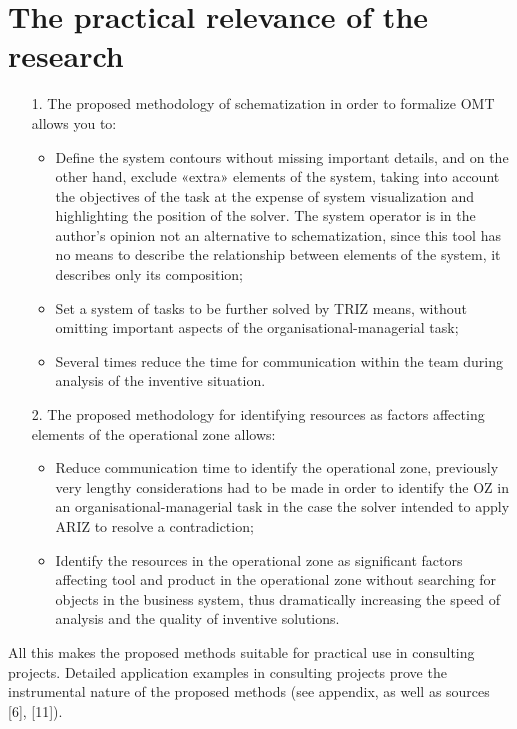 \documentclass[11pt,a4paper]{book}
\begin{document}
\section{The practical relevance of the research}
\begin{itemize}
\item [1.] The proposed methodology of schematization in order to formalize
  OMT allows you to:
  \begin{itemize}
  \item Define the system contours without missing important details, and on
    the other hand, exclude «extra» elements of the system, taking into
    account the objectives of the task at the expense of system visualization
    and highlighting the position of the solver. The system operator is in the
    author’s opinion not an alternative to schematization, since this tool has
    no means to describe the relationship between elements of the system, it
    describes only its composition;
  \item Set a system of tasks to be further solved by TRIZ means, without
    omitting important aspects of the organisational-managerial task;
  \item Several times reduce the time for communication within the team during
    analysis of the inventive situation.
  \end{itemize}
\item [2.] The proposed methodology for identifying resources as factors
  affecting elements of the operational zone allows:
  \begin{itemize}
  \item Reduce communication time to identify the operational zone, previously
    very lengthy considerations had to be made in order to identify the OZ in
    an organisational-managerial task in the case the solver intended to apply
    ARIZ to resolve a contradiction;
  \item Identify the resources in the operational zone as significant factors
    affecting tool and product in the operational zone without searching for
    objects in the business system, thus dramatically increasing the speed of
    analysis and the quality of inventive solutions.
  \end{itemize}
\end{itemize}
All this makes the proposed methods suitable for practical use in consulting
projects.  Detailed application examples in consulting projects prove the
instrumental nature of the proposed methods (see appendix, as well as sources
[6], [11]).
\end{document}
